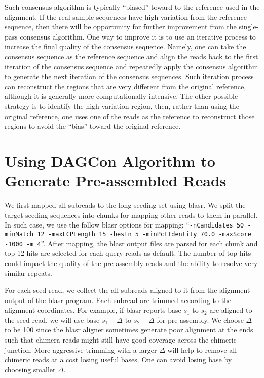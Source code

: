 \documentclass[11pt]{article}
\begin{document}
Such consensus algorithm is typically ``biased'' toward to the reference used in the alignment. If the real sample sequences have high variation from the reference sequence, then there will be opportunity for further improvement from the single-pass consensus algorithm.  One way to improve it is to use an iterative process to increase the final quality of the consensus sequence. Namely, one can take the consensus sequence as the reference sequence and align the reads back to the first iteration of the consensus sequence and repeatedly apply the consensus algorithm to generate the next iteration of the consensus sequences.  Such iteration process can reconstruct the regions that are very different from the original reference, although it is generally more computationally intensive. The other possible strategy is to identify the high variation region, then, rather than using the original reference, one uses one of the reads as the reference to reconstruct those regions to avoid the ``bias'' toward the original reference. 

\section{Using DAGCon Algorithm to Generate Pre-assembled Reads}

We first mapped all subreads to the long seeding set using blasr. We split the target seeding sequences into chunks for mapping other reads to them in parallel. In such case, we use the follow blasr options for mapping:  ``{\tt -nCandidates 50 -minMatch 12 -maxLCPLength 15 -bestn 5 -minPctIdentity 70.0 -maxScore -1000 -m 4}''.  After mapping, the blasr output files are parsed for each chunk and top 12 hits are selected for each query reads as default. The number of top hits could impact the quality of the pre-assembly reads and the ability to resolve very similar repeats. 

For each seed read, we collect the all subreads aligned to it from the alignment output of the blasr program. Each subread are trimmed according to the alignment coordinates. For example, if blasr reports base $s_1$ to $s_2$ are aligned to the seed read, we will use base $s_1+\Delta$ to $s_2-\Delta$ for pre-assembly. We choose $\Delta$ to be 100 since the blasr aligner sometimes generate poor alignment at the ends such that chimera reads might still have good coverage across the chimeric junction. More aggressive trimming with a larger $\Delta$ will help to remove all chimeric reads at a cost losing useful bases. One can avoid losing base by choosing smaller $\Delta$.
\end{document}
